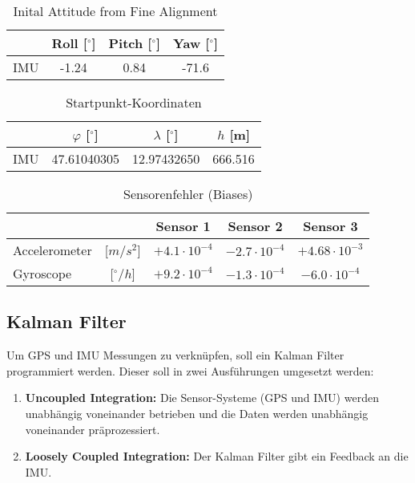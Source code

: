 \begin{table}[htbp]
	\centering
	\caption{Inital Attitude from Fine Alignment}
	\label{tab:fine_alignment}
		\begin{tabular}{ lccc }
		\addlinespace[10pt]
		   	& Roll [$^\circ$]	& Pitch [$^\circ$] 	& Yaw  [$^\circ$]\\ \toprule
		IMU 	& -1.24			& 0.84			& -71.6 \\ \bottomrule
		\end{tabular}
\end{table}

\begin{table}[htbp]
	\centering
	\caption{Startpunkt-Koordinaten}
	\label{tab:imu_start}
		\begin{tabular}{ lccc }
		\addlinespace[10pt]
		   	& $\varphi$ [$^\circ$] 	& $\lambda$ [$^\circ$] 	& $h$ [m]\\ \toprule
		IMU 	& 47.61040305			& 12.97432650			& 666.516 \\ \bottomrule
		\end{tabular}
\end{table}

\begin{table}[htbp]
	\centering
	\caption{Sensorenfehler (Biases)}
	\label{tab:biases}
		\begin{tabular}{ lcccc }
		\addlinespace[10pt]
		   					&	& Sensor 1		& Sensor 2 		& Sensor 3\\ \toprule
		Accelerometer& [$m/s^2$] 	& $+4.1\cdot 10^{-4}$	& $-2.7\cdot 10^{-4}$	& $+4.68\cdot 10^{-3}$ \\ 
		Gyroscope &[$^\circ/h$]		& $+9.2\cdot 10^{-4}$	& $-1.3\cdot 10^{-4}$ 	& $-6.0\cdot 10^{-4}$ \\ \bottomrule
		\end{tabular}
\end{table}

\subsection{Kalman Filter}

Um GPS und IMU Messungen zu verknüpfen, soll ein Kalman Filter programmiert werden. Dieser soll in zwei Ausführungen umgesetzt werden:
\begin{enumerate}
\item \textbf{Uncoupled Integration:} Die Sensor-Systeme (GPS und IMU) werden unabhängig voneinander betrieben und die Daten werden unabhängig voneinander präprozessiert.
\item \textbf{Loosely Coupled Integration:} Der Kalman Filter gibt ein Feedback an die IMU.
\end{enumerate}

